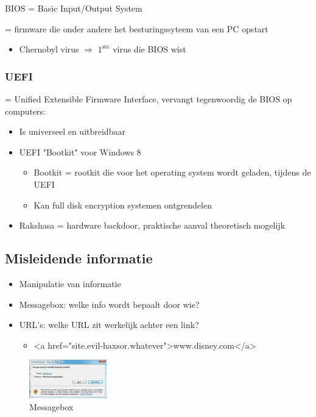 \documentclass{article}
\begin{document}
BIOS = Basic Input/Output System 

= firmware die onder andere het besturingssyteem van een PC opstart

\begin{itemize}
    \item Chernobyl virus $\Rightarrow$ $\text{1}^{\text{ste}}$ virus die BIOS wist
\end{itemize}

\subsubsection{UEFI}

= Unified Extensible Firmware Interface, vervangt tegenwoordig de BIOS op computers:

\begin{itemize}
    \item Is universeel en uitbreidbaar
    \item UEFI "Bootkit" voor Windows 8 
    \begin{itemize}
        \item Bootkit = rootkit die voor het operating system wordt geladen, tijdens de UEFI
        \item Kan full disk encryption systemen ontgrendelen
    \end{itemize}
    \item Rakshasa = hardware backdoor, praktische aanval theoretisch mogelijk
\end{itemize}

\subsection{Misleidende informatie}

\begin{itemize}
    \item Manipulatie van informatie
    \item Messagebox: welke info wordt bepaalt door wie?
    \item URL's: welke URL zit werkelijk achter een link?
    \begin{itemize}
        \item <a href="site.evil-haxsor.whatever">www.disney.com</a>
    \end{itemize}
\end{itemize}

\begin{figure}[H]
    \centering
    \includegraphics[width=0.3\textwidth]{messagebox.png}
    \caption{Messagebox}
\end{figure}
\end{document}

